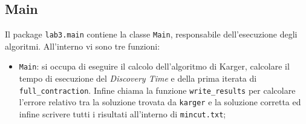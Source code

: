 \subsection{Main}
Il package \texttt{lab3.main} contiene la classe \texttt{Main}, responsabile dell'esecuzione degli algoritmi. All'interno vi sono tre funzioni:
\begin{itemize}
	\item \texttt{Main}: si occupa di eseguire il calcolo dell'algoritmo di Karger, calcolare il tempo di esecuzione del \textit{Discovery Time} e della prima iterata di \texttt{full\_contraction}. Infine chiama la funzione \texttt{write\_results} per calcolare l'errore relativo tra la soluzione trovata da \texttt{karger} e la soluzione corretta ed infine scrivere tutti i risultati all'interno di \texttt{mincut.txt};
\end{itemize}